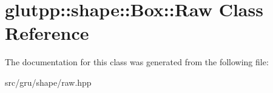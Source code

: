 \hypertarget{classglutpp_1_1shape_1_1Box_1_1Raw}{\section{glutpp\-:\-:shape\-:\-:\-Box\-:\-:\-Raw \-Class \-Reference}
\label{classglutpp_1_1shape_1_1Box_1_1Raw}
}


\-The documentation for this class was generated from the following file\-:\begin{DoxyCompactItemize}
\item 
src/gru/shape/raw.\-hpp\end{DoxyCompactItemize}
